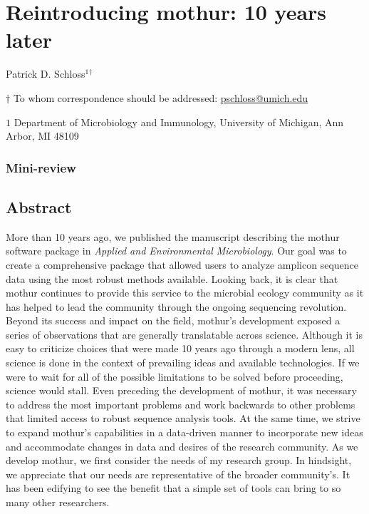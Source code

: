 \documentclass[11pt,]{article}
\title{}
\author{}
\date{}
\begin{document}
\vspace*{10mm}

\hypertarget{reintroducing-mothur-10-years-later}{%
\section{Reintroducing mothur: 10 years
later}\label{reintroducing-mothur-10-years-later}}

\vspace{35mm}

Patrick D. Schloss\({^1}\)\({^\dagger}\)

\vspace{40mm}

\(\dagger\) To whom correspondence should be addressed:
\href{mailto:pschloss@umich.edu}{pschloss@umich.edu}

\(1\) Department of Microbiology and Immunology, University of Michigan,
Ann Arbor, MI 48109

\vspace{35mm}

\hypertarget{mini-review}{%
\subsubsection{Mini-review}\label{mini-review}}

\newpage
\linenumbers

\hypertarget{abstract}{%
\subsection{Abstract}\label{abstract}}

More than 10 years ago, we published the manuscript describing the
mothur software package in \emph{Applied and Environmental
Microbiology}. Our goal was to create a comprehensive package that
allowed users to analyze amplicon sequence data using the most robust
methods available. Looking back, it is clear that mothur continues to
provide this service to the microbial ecology community as it has helped
to lead the community through the ongoing sequencing revolution. Beyond
its success and impact on the field, mothur's development exposed a
series of observations that are generally translatable across science.
Although it is easy to criticize choices that were made 10 years ago
through a modern lens, all science is done in the context of prevailing
ideas and available technologies. If we were to wait for all of the
possible limitations to be solved before proceeding, science would
stall. Even preceding the development of mothur, it was necessary to
address the most important problems and work backwards to other problems
that limited access to robust sequence analysis tools. At the same time,
we strive to expand mothur's capabilities in a data-driven manner to
incorporate new ideas and accommodate changes in data and desires of the
research community. As we develop mothur, we first consider the needs of
my research group. In hindsight, we appreciate that our needs are
representative of the broader community's. It has been edifying to see
the benefit that a simple set of tools can bring to so many other
researchers.
\end{document}
